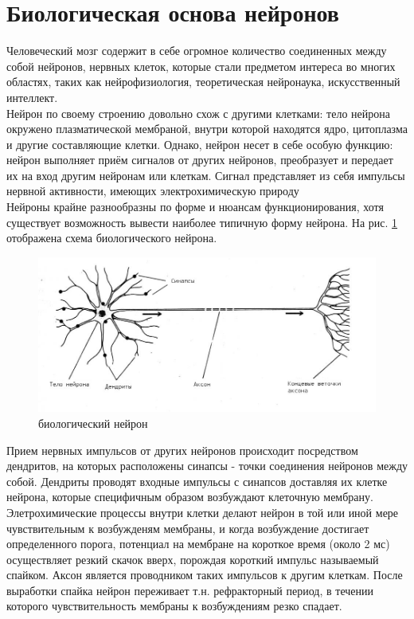 \documentclass[a4paper,10pt]{article}
\begin{document}
\section{Биологическая основа нейронов}
\indent Человеческий мозг содержит в себе огромное количество соединенных между собой нейронов, нервных клеток, которые стали предметом интереса во многих областях, таких как нейрофизиология, теоретическая нейронаука, искусственный интеллект.\\
\indent Нейрон по своему строению довольно схож с другими клетками: тело нейрона окружено плазматической мембраной, внутри которой находятся ядро, цитоплазма и другие составляющие клетки. Однако, нейрон несет в себе особую функцию: нейрон выполняет приём сигналов от других нейронов, преобразует и передает их на вход другим нейронам или клеткам. Сигнал представляет из себя импульсы нервной активности, имеющих электрохимическую природу\\
\indent Нейроны крайне разнообразны по форме и нюансам функционирования, хотя существует возможность вывести наиболее типичную форму нейрона. На рис. \ref{bio_pic} отображена схема биологического нейрона. \\
\begin{figure}[ht]
\centering
\includegraphics[width=1\linewidth]{bio_neuron.jpg}
\caption{биологический нейрон}
\label{bio_pic}
\end{figure}
\indent Прием нервных импульсов от других нейронов происходит посредством дендритов, на которых расположены синапсы - точки соединения нейронов между собой. Дендриты проводят входные импульсы с синапсов доставляя их клетке нейрона, которые специфичным образом возбуждают клеточную мембрану.\\
\indent Элетрохимические процессы внутри клетки делают нейрон в той или иной мере чувствительным к возбужденям мембраны, и когда возбуждение достигает определенного порога, потенциал на мембране на короткое время (около 2 мс) осуществляет резкий скачок вверх, порождая короткий импульс называемый спайком. Аксон является проводником таких импульсов к другим клеткам. После выработки спайка нейрон переживает т.н. рефракторный период, в течении которого чувствительность мембраны к возбуждениям резко спадает.\\
\end{document}
